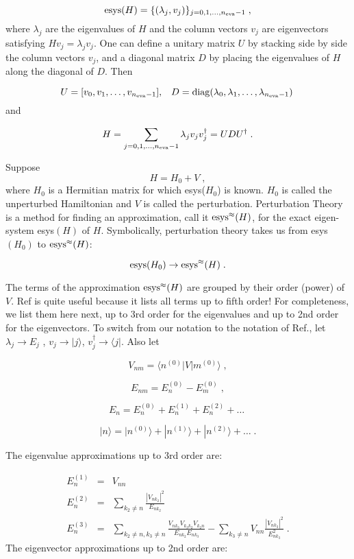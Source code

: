 \documentclass[12pt]{article}%
\newcommand{\bra}[1]{\langle#1|}
\newcommand{\ket}[1]{|#1\rangle}
\newcommand{\beq}{\begin{equation}}
\newcommand{\eeq}{\end{equation}}
\newcommand{\beqa}{\begin{eqnarray}}
\newcommand{\eeqa}{\end{eqnarray}}
\newcommand{\rarrow}[0]{\rightarrow}
\newcommand{\lam}[0]{\lambda}
\newcommand{\nev}[0]{{n_{\rm eva}}}
\begin{document}
\beq
{\rm esys}(H) = \{ (\lam_j, v_j)\}_{j=0, 1, ..., \nev-1}
\;,
\eeq
where $\lam_j$ are the
eigenvalues of $H$ and the column vectors $v_j$
are eigenvectors satisfying $Hv_j = \lam_jv_j$.
One can define a unitary matrix $U$
by stacking
side by side the column vectors $v_j$,
and a diagonal matrix $D$
by placing the eigenvalues of
$H$ along the diagonal of $D$. Then

\beq
U = [ v_0, v_1, \ldots, v_{\nev-1}],\;\;\;
D = {\rm diag}(\lam_0, \lam_1, \ldots, \lam_{\nev-1})
\;
\eeq
and

\beq
H = \sum_{j=0, 1, ..., \nev-1} \lam_j v_jv^\dag_j
= UDU^\dag
\;.
\eeq

Suppose
\beq H = H_0 + V
\;,
\eeq
where $H_0$ is a Hermitian matrix for which esys($H_0$)
is known. $H_0$ is called the unperturbed
Hamiltonian and $V$ is called
the perturbation.  Perturbation
Theory is a method for finding an
approximation, call it ${\rm esys}^\approx(H)$,
for the exact eigen-system esys$(H)$ of $H$.
Symbolically, perturbation theory
takes us from esys$(H_0)$
to ${\rm esys}^\approx(H)$:


\beq
{\rm esys}(H_0) \rarrow {\rm esys}^\approx(H)
\;.
\eeq


The terms of the approximation ${\rm esys}^\approx(H)$
are grouped by their order (power) of $V$.
Ref\cite{pert-wiki} is quite useful because
it lists all terms up to fifth order!
 For completeness, we
list them here next,
up to 3rd order for the eigenvalues
and up to 2nd order for the eigenvectors.
To switch from our notation to the notation
of Ref.\cite{pert-wiki}, let
$\lam_j \rarrow E_j$ , $v_j\rarrow \ket{j}$,
$v_j^\dag \rarrow \bra{j}$. Also let

\beq
V_{nm} = \bra{n^{(0)}} V \ket{m^{(0)}}
\;,
\eeq

\beq
E_{nm} = E^{(0)}_n - E^{(0)}_m
\;,
\eeq

\beq
E_n = E^{(0)}_n + E^{(1)}_n +  E^{(2)}_n +\ldots
\;
\eeq

\beq
\ket{n} = \ket{n^{(0)}} +
 \ket{n^{(1)}} +\ket{n^{(2)}} + \ldots
\;.
\eeq

The eigenvalue approximations
 up to 3rd order are:


\beqa
E^{(1)}_n &=& V_{nn}
\\
E^{(2)}_n &=& \sum_{k_2\neq n}\frac{|V_{nk_2}|^2}{E_{nk_2}}
\\
E^{(3)}_n &=&
\sum_{k_2\neq n, k_3\neq n}
\frac{V_{nk_3}V_{k_3k_2}V_{k_2n}}{E_{nk_2}E_{nk_3}}
-\sum_{k_3\neq n} V_{nn}\frac{|V_{nk_3}|^2}{E^2_{nk_3}}
\;.
\eeqa
The eigenvector approximations
up to 2nd order are:
\end{document}
